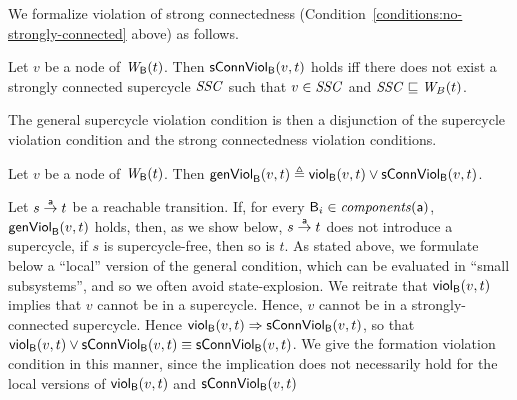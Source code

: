 
We formalize violation of strong connectedness (Condition~\ref{conditions:no-strongly-connected} above)
as follows.

\begin{definition}
\label{def:sConn.violation}
 Let $v$ be a node of $\wfg{\B}{t}$.   Then $\connViol{v}{t}$ holds iff there does not exist a 
strongly connected supercycle $\SSC$ such that $v \in \SSC$ and $\SSC \subg \wfg{B}{t}$.
\end{definition}



The general supercycle violation condition is then a disjunction of the supercycle violation condition
and the strong connectedness violation conditions.


\begin{definition}
\label{def:formation.violation} 
\label{defn:formation.violation} 
Let $v$ be a node of $\wfg{\B}{t}$.
Then 
$\genViol{v}{t}  \df \scV{v}{t}  \lor \connViol{v}{t}$.
\end{definition}
%
Let $s \goesto[\act] t$ be a reachable transition. If, for every $\B_i \in \cmps{\act}$, $\formViol{v}{t}$ holds, then, as we show below,
$s \goesto[\act] t$ does not introduce a supercycle, \ie if $s$ is supercycle-free, then so is $t$. As stated above, we formulate below a ``local''
version of the general condition, which can be evaluated in ``small subsystems'', and so we often avoid state-explosion.
%
%
We reitrate that $\scV{v}{t}$ implies that $v$ cannot be in a supercycle. Hence, $v$ cannot be in a strongly-connected supercycle.
Hence $\scV{v}{t} \imp \connViol{v}{t}$, so that 
$\scV{v}{t}  \lor \connViol{v}{t} \ev  \connViol{v}{t}$.
We give the formation violation condition in this manner, since 
the implication does not necessarily hold for the local versions of $\scV{v}{t}$ and $\connViol{v}{t}$



